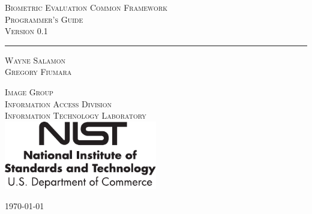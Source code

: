 \begin{titlepage}
\begin{center}

\textsc{\LARGE Biometric Evaluation Common Framework}\\[0.5cm]
\textsc{\Large Programmer's Guide}\\[0.2cm]
\textsc{\Large Version 0.1}
\rule{\linewidth}{0.5mm}

\vfill

\textsc {\Large Wayne Salamon}\\[0.2cm]
\textsc {\Large Gregory Fiumara}

\vfill

\textsc{\Large Image Group}\\[0.2cm]
\textsc{\Large Information Access Division}\\[0.2cm]
\textsc{\Large Information Technology Laboratory}\\[0.4cm]

\includegraphics[width=0.50\textwidth]{nistident_cent_vec.pdf}

\vfill

\textsc{\large \today}
\vfill
\end{center}
\end{titlepage}
